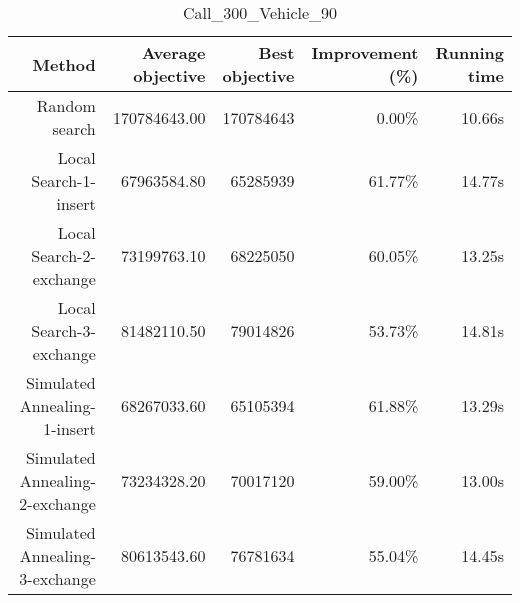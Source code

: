 \begin{table}[ht]
\centering
\caption{Call\_300\_Vehicle\_90}
\label{tab:call300vehicle90}
\begin{tabular}{|r|r|r|r|r|}
Method & Average objective & Best objective & Improvement (\%) & Running time \\
\hline
Random search & 170784643.00 & 170784643 & 0.00\% & 10.66s\\
Local Search-1-insert & 67963584.80 & 65285939 & 61.77\% & 14.77s\\
Local Search-2-exchange & 73199763.10 & 68225050 & 60.05\% & 13.25s\\
Local Search-3-exchange & 81482110.50 & 79014826 & 53.73\% & 14.81s\\
Simulated Annealing-1-insert & 68267033.60 & 65105394 & 61.88\% & 13.29s\\
Simulated Annealing-2-exchange & 73234328.20 & 70017120 & 59.00\% & 13.00s\\
Simulated Annealing-3-exchange & 80613543.60 & 76781634 & 55.04\% & 14.45s\\
\end{tabular}%
\end{table}
